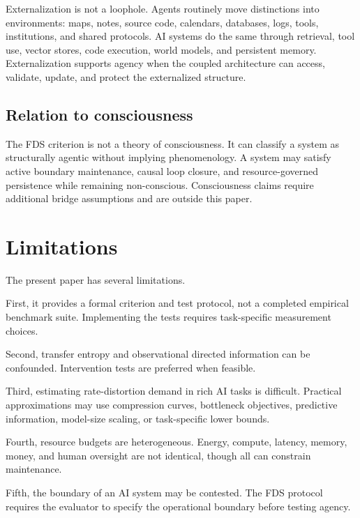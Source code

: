 \documentclass[10pt,a4paper,twocolumn,aps,prl]{revtex4-2}
\begin{document}
Externalization is not a loophole. Agents routinely move distinctions into environments: maps, notes, source code, calendars, databases, logs, tools, institutions, and shared protocols. AI systems do the same through retrieval, tool use, vector stores, code execution, world models, and persistent memory. Externalization supports agency when the coupled architecture can access, validate, update, and protect the externalized structure.

\subsection{Relation to consciousness}

The FDS criterion is not a theory of consciousness. It can classify a system as structurally agentic without implying phenomenology. A system may satisfy active boundary maintenance, causal loop closure, and resource-governed persistence while remaining non-conscious. Consciousness claims require additional bridge assumptions and are outside this paper.

\section{Limitations}

The present paper has several limitations.

First, it provides a formal criterion and test protocol, not a completed empirical benchmark suite. Implementing the tests requires task-specific measurement choices.

Second, transfer entropy and observational directed information can be confounded. Intervention tests are preferred when feasible.

Third, estimating rate-distortion demand in rich AI tasks is difficult. Practical approximations may use compression curves, bottleneck objectives, predictive information, model-size scaling, or task-specific lower bounds.

Fourth, resource budgets are heterogeneous. Energy, compute, latency, memory, money, and human oversight are not identical, though all can constrain maintenance.

Fifth, the boundary of an AI system may be contested. The FDS protocol requires the evaluator to specify the operational boundary before testing agency.
\end{document}
